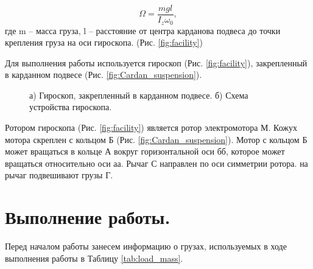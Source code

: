 \documentclass[12pt,a4paper]{article}
\begin{document}
\begin{equation}
	\Omega = \frac{mgl}{I_{z}\omega_{0}},
	\label{eq:teor_equation_omega}
\end{equation} 
где m -- масса груза, l -- расстояние от центра карданова подвеса до точки крепления груза на оси гироскопа. (Рис. \ref{fig:facility})

Для выполнения работы используется гироскоп (Рис. \ref{fig:facility}), закрепленный в карданном подвесе (Рис. \ref{fig:Cardan_suspension}).


\begin{figure}[ht!]  
	\vspace{-4ex} 
	\centering 
	\hspace{4ex}
	\caption{а) Гироскоп, закрепленный в карданном подвесе. б) Схема устройства гироскопа.}
\end{figure}

Ротором гироскопа (Рис. \ref{fig:facility}) является ротор электромотора М. Кожух мотора скреплен с кольцом Б (Рис. \ref{fig:Cardan_suspension}). Мотор с кольцом Б может вращаться в кольце А вокруг горизонтальной оси бб, которое может вращаться относительно оси аа. Рычаг С направлен по оси симметрии ротора. на рычаг подвешивают грузы Г.


\section{Выполнение работы.}
Перед началом работы занесем информацию о грузах, используемых в ходе выполнения работы в Таблицу \ref{tab:load_mass}.
\end{document}
